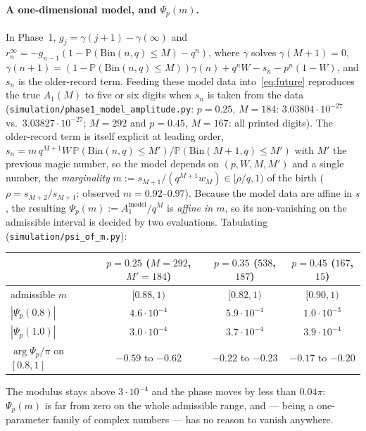 \documentclass[11pt]{article}
\theoremstyle{definition}
\newcommand{\Bin}{\mathrm{Bin}}
\newcommand{\Prob}{\mathbb{P}}
\begin{document}
\paragraph{A one-dimensional model, and $\Psi_p(m)$.}  In Phase~1,
$g_j=\gamma(j+1)-\gamma(\infty)$ and $r_n^\infty=-g_{n-1}
(1-\Prob(\Bin(n,q)\le M)-q^n)$, where $\gamma$ solves
$\gamma(M+1)=0$, $\gamma(n+1)=(1-\Prob(\Bin(n,q)\le M))\gamma(n)
+q^nW-s_n-p^n(1-W)$, and $s_n$ is the older-record term.  Feeding these
model data into~\eqref{eq:future} reproduces the true $A_1(M)$ to five
or six digits when $s_n$ is taken from the data
(\texttt{simulation/phase1\_model\_amplitude.py}: $p=0.25$, $M=184$:
$3.03804\cdot10^{-27}$ vs.\ $3.03827\cdot10^{-27}$; $M=292$ and
$p=0.45$, $M=167$: all printed digits).  The older-record term is itself
explicit at leading order, $s_n=m\,q^{M+1}W\,
\Prob(\Bin(n,q)\le M')/\Prob(\Bin(M+1,q)\le M')$ with $M'$ the previous
magic number, so the model depends on $(p,W,M,M')$ and a single number,
the \emph{marginality} $m:=s_{M+1}/(q^{M+1}w_M)\in[\rho/q,1)$ of the
birth ($\rho=s_{M+2}/s_{M+1}$; observed $m=0.92$–$0.97$).  Because the
model data are affine in $s$, the resulting
$\Psi_p(m):=A_1^{\mathrm{model}}/q^M$ is \emph{affine in $m$}, so its
non-vanishing on the admissible interval is decided by two evaluations.
Tabulating (\texttt{simulation/psi\_of\_m.py}):
\begin{center}
\begin{tabular}{@{}lccc@{}}
\toprule
 & $p=0.25$ ($M=292$, $M'=184$) & $p=0.35$ ($538$, $187$) & $p=0.45$ ($167$, $15$) \\
\midrule
admissible $m$ & $[0.88,1)$ & $[0.82,1)$ & $[0.90,1)$ \\
$|\Psi_p(0.8)|$ & $4.6\cdot10^{-4}$ & $5.9\cdot10^{-4}$ & $1.0\cdot10^{-3}$ \\
$|\Psi_p(1.0)|$ & $3.0\cdot10^{-4}$ & $3.7\cdot10^{-4}$ & $3.9\cdot10^{-4}$ \\
$\arg\Psi_p/\pi$ on $[0.8,1]$ & $-0.59$ to $-0.62$ & $-0.22$ to $-0.23$ & $-0.17$ to $-0.20$ \\
\bottomrule
\end{tabular}
\end{center}
The modulus stays above $3\cdot10^{-4}$ and the phase moves by less
than $0.04\pi$: $\Psi_p(m)$ is far from zero on the whole admissible
range, and --- being a one-parameter family of complex numbers --- has
no reason to vanish anywhere.
\end{document}
